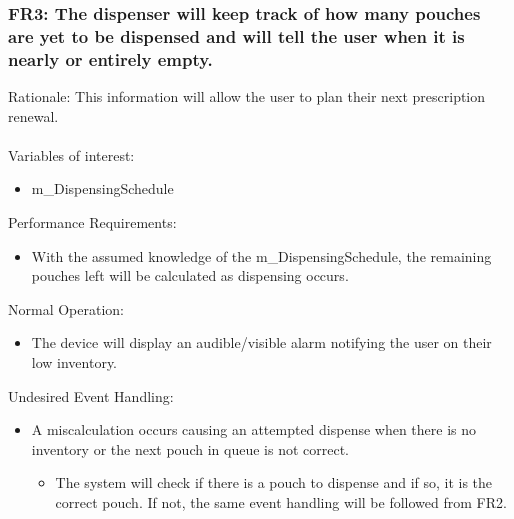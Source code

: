 \documentclass[12pt]{article}
\begin{document}
\subsubsection*{FR3: The dispenser will keep track of how many pouches are yet to be dispensed and will tell the user when it is nearly or entirely empty.}
Rationale: This information will allow the user to plan their next prescription renewal.
\\\\
Variables of interest:
\begin{itemize}[noitemsep,topsep=0pt]
    \item m\_DispensingSchedule
\end{itemize} 
\bigskip
Performance Requirements: 
\begin{itemize}[noitemsep,topsep=0pt]
    \item With the assumed knowledge of the m\_DispensingSchedule, the remaining pouches left will be calculated as dispensing occurs.
\end{itemize}
\bigskip
Normal Operation:
\begin{itemize}[noitemsep,topsep=0pt]
    \item The device will display an audible/visible alarm notifying the user on their low inventory.
\end{itemize}
\bigskip
Undesired Event Handling:
\begin{itemize}[noitemsep,topsep=0pt]
    \item A miscalculation occurs causing an attempted dispense when there is no inventory or the next pouch in queue is not correct.
    \begin{itemize}
        \item The system will check if there is a pouch to dispense and if so, it is the correct pouch. If not, the same event handling will be followed from FR2. 
    \end{itemize}
\end{itemize}
\bigskip

\end{document}
